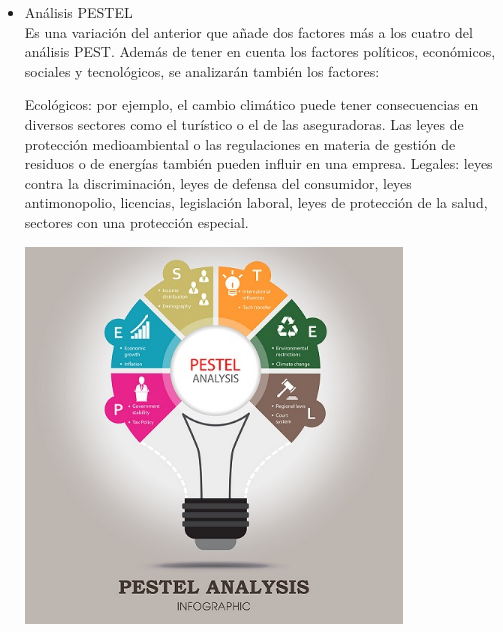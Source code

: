 	\begin{itemize}
\item Análisis PESTEL
\\Es una variación del anterior que añade dos factores más a los cuatro del análisis PEST. Además de tener en cuenta los factores políticos, económicos, sociales y tecnológicos, se analizarán también los factores:

Ecológicos: por ejemplo, el cambio climático puede tener consecuencias en diversos sectores como el turístico o el de las aseguradoras. Las leyes de protección medioambiental o las regulaciones en materia de gestión de residuos o de energías también pueden influir en una empresa.
Legales: leyes contra la discriminación, leyes de defensa del consumidor, leyes antimonopolio, licencias, legislación laboral, leyes de protección de la salud, sectores con una protección especial.
		\begin{center}
		\includegraphics[width=10cm]{./Imagenes/Imagen2}
		\end{center}
	\end{itemize} 
\\
